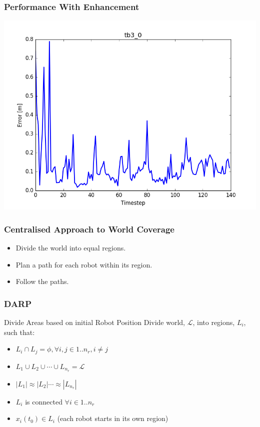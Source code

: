 \documentclass{beamer}
\begin{document}
	\begin{frame}
		\frametitle{Performance With Enhancement}
		\includegraphics[width=\columnwidth]{figure_l1.png}
	\end{frame}
	\begin{frame}
		\frametitle{Centralised Approach to World Coverage}
		\pause
		\begin {itemize}
			\item<2-> Divide the world into equal regions.
			\item<3-> Plan a path for each robot within its region.
			\item<4-> Follow the paths.	
		\end {itemize}
	\end{frame}
	\begin{frame}
		\frametitle{DARP}
		Divide Areas based on initial Robot Position
		Divide world, $\mathcal{L}$, into regions, $L_i$, such that:
		\begin{itemize}
			\item<2-> $L_i \cap L_j = \phi, \forall i, j  \in 1..n_r, i \neq j$
			\item<3-> $L_1 \cup L_2 \cup \cdots \cup L_{n_r} = \mathcal{L}$
			\item<4-> $|L_1| \approx |L_2| \cdots \approx |L_{n_r}|$
			\item<5-> $L_i$ is connected $\forall i\in 1..n_r$
			\item<6-> $x_i(t_0) \in L_i$ (each robot starts in its own region)
		\end{itemize}
	\end{frame}
\end{document}
